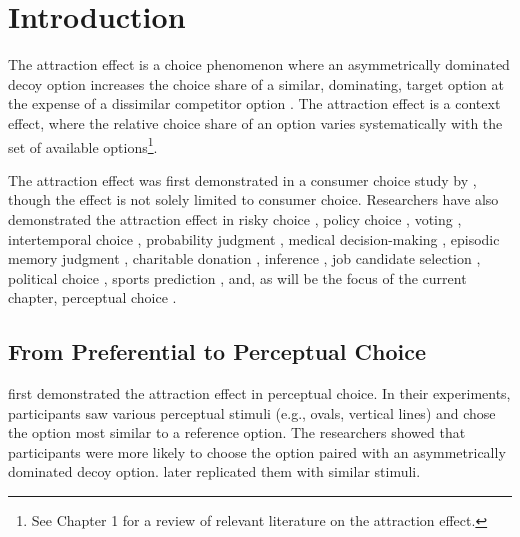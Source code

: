 \section{Introduction}
The attraction effect is a choice phenomenon where an asymmetrically dominated decoy option increases the choice share of a similar, dominating, target option at the expense of a dissimilar competitor option \parencite{huberAddingAsymmetricallyDominated1982d}. The attraction effect is a context effect, where the relative choice share of an option varies systematically with the set of available options\footnote{See Chapter 1 for a review of relevant literature on the attraction effect.}.

The attraction effect was first demonstrated in a consumer choice study by \textcite{huberAddingAsymmetricallyDominated1982d}, though the effect is not solely limited to consumer choice. Researchers have also demonstrated the attraction effect in risky choice \parencite{mohr2017attraction}, policy choice \parencite{herneDecoyAlternativesPolicy1997b}, voting \parencite{o1995attraction}, intertemporal choice \parencite{mariniAttractionComesMany2020}, probability judgment \parencite{caiWhenAlternativeHypotheses2023,fang2024context}, medical decision-making \parencite{schwartz1999more}, episodic memory judgment \parencite{maylorSimilarityAttractionEffects2007b}, charitable donation \parencite{pittarello2020three}, inference \parencite{truebloodMultialternativeContextEffects2012}, job candidate selection \parencite{highhouseContextDependentSelectionEffects1996}, political choice \parencite{o1995attraction}, sports prediction \parencite{fang2024context}, and, as will be the focus of the current chapter, perceptual choice \parencite{evansImpactPresentationOrder2021,trueblood2013not, trueblood2015fragile, spektorRepulsionEffectPreferential2022,spektorWhenGoodLooks2018b,yearsleyContextEffectsSimilarity2022,turnerCompetingTheoriesMultialternative2018a,liaoInfluenceDistanceDecoy2021}. 

\subsection{From Preferential to Perceptual Choice}

\textcite{choplinComparisoninducedDecoyEffects2005b} first demonstrated the attraction effect in perceptual choice. In their experiments, participants saw various perceptual stimuli (e.g., ovals, vertical lines) and chose the option most similar to a reference option. The researchers showed that participants were more likely to choose the option paired with an asymmetrically dominated decoy option. \textcite{yearsleyContextEffectsSimilarity2022} later replicated them with similar stimuli.

